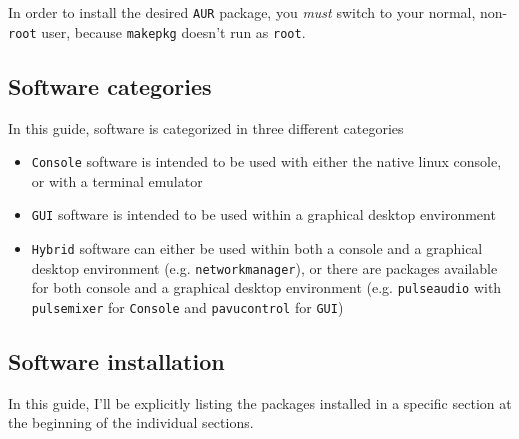 \documentclass[10pt]{dustdoc}
\begin{document}
\begin{WARNING}
    In order to install the desired \texttt{AUR} package, you \emph{must} switch to your normal, non-\texttt{root} user, because \texttt{makepkg} doesn’t run as \texttt{root}.
\end{WARNING}


\subsection{Software categories}
\label{sec:software-categories}

In this guide, software is categorized in three different categories

\begin{itemize}
    \item \texttt{Console} software is intended to be used with either the native linux console, or with a terminal emulator

    \item \texttt{GUI} software is intended to be used within a graphical desktop environment

    \item \texttt{Hybrid} software can either be used within both a console and a graphical desktop environment (e.g. \texttt{networkmanager}), or there are packages available for both console and a graphical desktop environment (e.g. \texttt{pulseaudio} with \texttt{pulsemixer} for \texttt{Console} and \texttt{pavucontrol} for \texttt{GUI})
\end{itemize}

\subsection{Software installation}
\label{sec:software-installation}

In this guide, I’ll be explicitly listing the packages installed in a specific section at the beginning of the individual sections.
\end{document}
